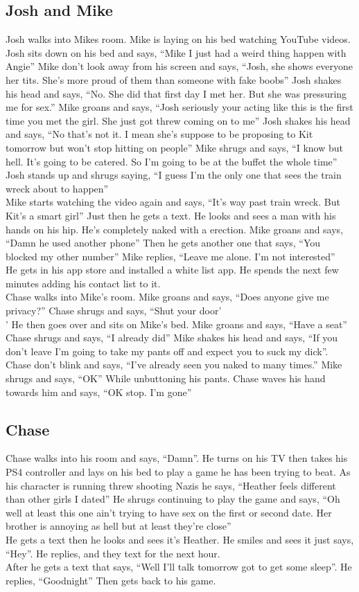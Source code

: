 \documentclass{article}[12px]
\begin{document}
	\subsection* {Josh and Mike}
	Josh walks into Mikes room. Mike is laying on his bed watching YouTube videos. Josh sits down on his bed and says, ``Mike I just had a weird thing happen with Angie'' Mike don't look away from his screen and says, ``Josh, she shows everyone her tits. She's more proud of them than someone with fake boobs'' Josh shakes his head and says, ``No. She did that first day I met her. But she was pressuring me for sex.'' Mike groans and says, ``Josh seriously your acting like this is the first time you met the girl. She just got threw coming on to me'' Josh shakes his head and says, ``No that's not it. I mean she's suppose to be proposing to Kit tomorrow but won't stop hitting on people'' Mike shrugs and says, ``I know but hell. It's going to be catered. So I'm going to be at the buffet the whole time'' Josh stands up and shrugs saying, ``I guess I'm the only one that sees the train wreck about to happen''\\
	
	Mike starts watching the video again and says, ``It's way past train wreck. But Kit's a smart girl'' Just then he gets a text. He looks and sees a man with his hands on his hip. He's completely naked with a erection. Mike groans and says, ``Damn he used another phone'' Then he gets another one that says, ``You blocked my other number'' Mike replies, ``Leave me alone. I'm not interested''\\
	
	He gets in his app store and installed a white list app. He spends the next few minutes adding his contact list to it.\\  
	
	Chase walks into Mike's room. Mike groans and says, ``Does anyone give me privacy?'' Chase shrugs and says, ``Shut your door'\\
	' 
	He then goes over and sits on Mike's bed. Mike groans and says, ``Have a seat'' Chase shrugs and says, ``I already did'' Mike shakes his head and says, ``If you don't leave I'm going to take my pants off and expect you to suck my dick''. Chase don't blink and says, ``I've already seen you naked to many times.'' Mike shrugs and says, ``OK'' While unbuttoning his pants. Chase waves his hand towards him and says, ``OK stop. I'm gone''
	
	\subsection *{Chase}
	Chase walks into his room and says, ``Damn''. He turns on his TV then takes his PS4 controller and lays on his bed to play a game he has been trying to beat. As his character is running threw shooting Nazis he says, ``Heather feels different than other girls I dated'' He shrugs continuing to play the game and says, ``Oh well at least this one ain't trying to have sex on the first or second date. Her brother is annoying as hell but at least they're close''\\
	
	He gets a text then he looks and sees it's Heather. He smiles and sees it just says, ``Hey''. He replies, and they text for the next hour.\\
	After he gets a text that says, ``Well I'll talk tomorrow got to get some sleep''. He replies, ``Goodnight'' Then gets back to his game.
\end{document}
